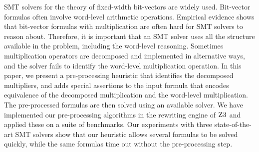 %
SMT solvers for the theory of fixed-width bit-vectors are widely used.
%
Bit-vector formulas often involve word-level arithmetic
operations.
%
Empirical evidence shows that bit-vector formulas with multiplication
are often hard for SMT solvers to reason about.
%
Therefore, it is important that an SMT solver uses all 
the structure available in the problem, including the
word-level reasoning.
%
Sometimes multiplication operators are decomposed and implemented in
alternative ways, and the solver fails to identify the word-level
multiplication operation.
%
In this paper, we present a pre-processing heuristic that identifies
the decomposed multipliers, and adds special assertions to the input
formula that encodes equivalence of the decomposed multiplication and
the word-level multiplication.  The pre-processed formulas are then
solved using an available solver.
%
We have implemented our pre-processing algorithms in the rewriting
engine of $\textsc{Z3}$ and applied these on a suite of benchmarks.
%
Our experiments with three state-of-the-art SMT solvers show that our
heuristic allows several formulas to be solved quickly, while the same
formulas time out without the pre-processing step.
%


